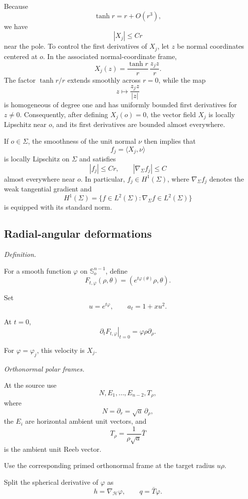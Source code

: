 \documentclass[11pt,reqno]{amsart}
\numberwithin{equation}{section}
\theoremstyle{definition}
\theoremstyle{remark}
\newcommand{\sphere}{\mathbb S_o^{n-1}}
\newcommand{\ithead}[1]{%
  \par\medskip\noindent\textit{#1}\enspace
}
\begin{document}
Because
\[
\tanh r=r+O(r^3),
\]
we have
\[
|X_j|\le Cr
\]
near the pole. To control the first derivatives of \(X_j\), let \(z\) be
normal coordinates centered at \(o\). In the associated
normal-coordinate frame,
\[
X_j(z)
=
\frac{\tanh r}{r}\,
\frac{z_jz}{r}.
\]
The factor \(\tanh r/r\) extends smoothly across \(r=0\), while the map
\[
z\longmapsto \frac{z_jz}{|z|}
\]
is homogeneous of degree one and has uniformly bounded first derivatives
for \(z\ne0\). Consequently, after defining \(X_j(o)=0\), the vector field
\(X_j\) is locally Lipschitz near \(o\), and its first derivatives are
bounded almost everywhere.

If \(o\in\Sigma\), the smoothness of the unit normal \(\nu\) then implies
that
\[
f_j=\langle X_j,\nu\rangle
\]
is locally Lipschitz on \(\Sigma\) and satisfies
\[
|f_j|\le Cr,
\qquad
|\nabla_\Sigma f_j|\le C
\]
almost everywhere near \(o\). In particular, \(f_j\in H^1(\Sigma)\), where
\(\nabla_\Sigma f_j\) denotes the weak tangential gradient and
\[
H^1(\Sigma)
=
\{f\in L^2(\Sigma):\nabla_\Sigma f\in L^2(\Sigma)\}
\]
is equipped with its standard norm.

\subsection{Radial-angular deformations}

\ithead{Definition.}

For a smooth function \(\varphi\) on \(\sphere\), define
\[
F_{t,\varphi}(\rho,\theta)
=
\left(
e^{t\varphi(\theta)}\rho,
\theta
\right).
\]

Set
\[
u=e^{t\varphi},
\qquad
a_t=1+xu^2.
\]

At \(t=0\),
\[
\left.
\partial_tF_{t,\varphi}
\right|_{t=0}
=
\varphi\rho\partial_\rho.
\]

For \(\varphi=\varphi_j\), this velocity is \(X_j\).

\ithead{Orthonormal polar frames.}

At the source use
\[
N,E_1,\dots,E_{n-2},T_\rho,
\]
where
\[
N=\partial_r=\sqrt a\,\partial_\rho,
\]
the \(E_i\) are horizontal ambient unit vectors, and
\[
T_\rho
=
\frac{1}{\rho\sqrt a}\bar T
\]
is the ambient unit Reeb vector.

Use the corresponding primed orthonormal frame at the target radius
\(u\rho\).

Split the spherical derivative of \(\varphi\) as
\[
h=\nabla_{\mathcal H}\varphi,
\qquad
q=\bar T\varphi.
\]
\end{document}
